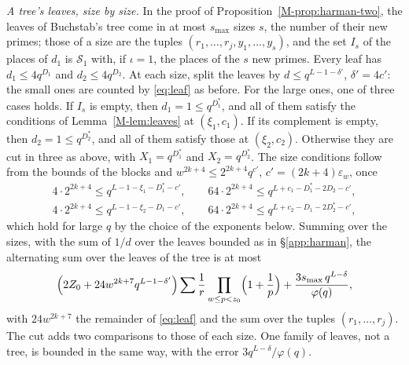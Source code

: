 \documentclass[11pt]{article}
\numberwithin{equation}{section}
\begin{document}
\emph{A tree's leaves, size by size.} In the proof of Proposition~\ref{M-prop:harman-two}, the leaves of Buchstab's
tree come in at most $s_{\max}$ sizes $s$, the number of their new primes; those of a size are the tuples $(r_1, \dots,
r_j, y_1, \dots, y_s)$, and the set $I_s$ of
the places of $d_1$ is $\mathcal S_1$ with, if $\iota = 1$, the places of the $s$ new primes. Every leaf has $d_1 \le
4q^{D_1}$ and $d_2 \le 4q^{D_2}$. At each size, split the leaves by $d \le q^{L - 1 - \delta'}$, $\delta' = 4c'$: the
small ones are counted by \eqref{eq:leaf} as before. For the large ones, one of three cases holds. If $I_s$ is empty,
then $d_1 = 1 \le q^{D_1^*}$, and all of them satisfy the conditions of Lemma~\ref{M-lem:leaves} at $(\xi_1, c_1)$. If
its
complement is empty, then $d_2 = 1 \le q^{D_2^*}$, and all of them satisfy those at $(\xi_2, c_2)$. Otherwise they are
cut in three as above, with $X_1 = q^{D_1^*}$ and $X_2 = q^{D_2^*}$. The size conditions follow from the bounds of the
blocks
and $w^{2k + 4} \le 2^{2k + 4} q^{c'}$, $c' = (2k + 4)\varepsilon_w$, once
\begin{gather*}
  4 \cdot 2^{2k + 4} \le q^{L - 1 - \xi_1 - D_1^* - c'}, \qquad 64 \cdot 2^{2k + 4} \le q^{L + c_1 - D_1^* - 2D_2 - c'},
  \\
  4 \cdot 2^{2k + 4} \le q^{L - 1 - \xi_2 - D_1 - c'}, \qquad 64 \cdot 2^{2k + 4} \le q^{L + c_2 - D_1 - 2D_2^* - c'},
\end{gather*}
which hold for large $q$ by the choice of the exponents below. Summing over the sizes, with the sum of $1/d$ over the
leaves bounded as in \S\ref{app:harman}, the alternating sum over the leaves of the tree is at most
\[
  \Bigl(2Z_0 + 24 w^{2k + 7} q^{L - 1 - \delta'}\Bigr) \sum \frac1r \prod_{w \le p < z_0} \Bigl(1 + \frac1p\Bigr) +
  \frac{3s_{\max}\, q^{L - \delta}}{\varphi(q)},
\]
with $24 w^{2k + 7}$ the remainder of \eqref{eq:leaf} and the sum over the tuples $(r_1, \dots, r_j)$. The cut adds two
comparisons to those of each size. One family of leaves, not a tree, is bounded in the same way, with the error
$3q^{L - \delta}/\varphi(q)$.
\end{document}
